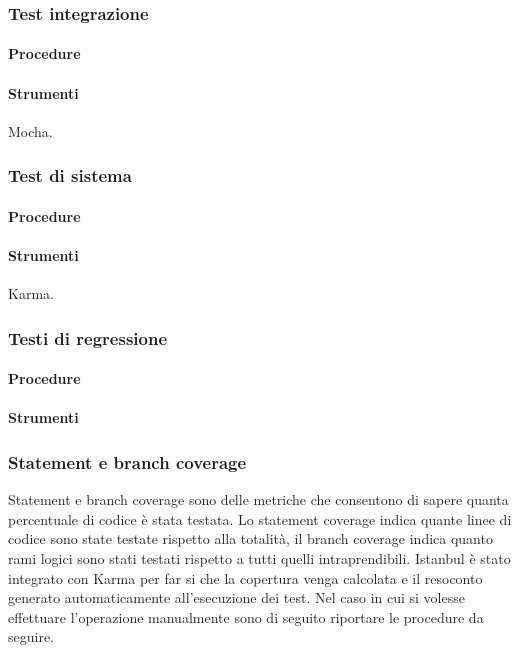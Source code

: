 \subsubsection{Test integrazione}



\paragraph{Procedure}

\paragraph{Strumenti}
Mocha.

\subsubsection{Test di sistema}

\paragraph{Procedure}

\paragraph{Strumenti}
Karma.

\subsubsection{Testi di regressione}

\paragraph{Procedure}

\paragraph{Strumenti}

\subsubsection{Statement e branch coverage}
Statement e branch coverage sono delle metriche che consentono di sapere quanta percentuale di codice è stata testata.
Lo statement coverage indica quante linee di codice sono state testate rispetto alla totalità, il branch coverage indica quanto rami logici sono stati testati rispetto a tutti quelli intraprendibili.
Istanbul è stato integrato con Karma per far si che la copertura venga calcolata e il resoconto generato automaticamente all'esecuzione dei test.
Nel caso in cui si volesse effettuare l'operazione manualmente sono di seguito riportare le procedure da seguire.

